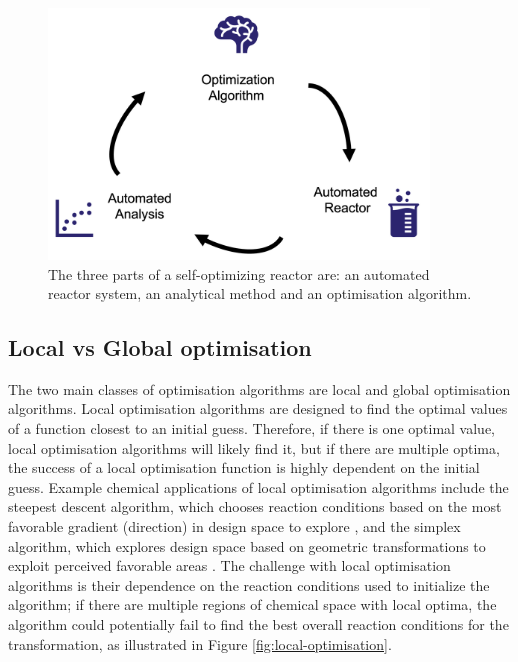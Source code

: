 \begin{figure}
    \centering
    \includegraphics[width=0.9\textwidth]{gfx/Chapter03/self-optimization-cycle.png}
    \caption{The three parts of a self-optimizing reactor are: an automated reactor system, an analytical method and an optimisation algorithm.}
    \label{fig:optimisation-cycle}
\end{figure}

\subsection{Local vs Global optimisation}
The two main classes of optimisation algorithms are local and global optimisation algorithms. Local optimisation algorithms are designed to find the optimal values of a function closest to an initial guess. Therefore, if there is one optimal value, local optimisation algorithms will likely find it, but if there are multiple optima, the success of a local optimisation function is highly dependent on the initial guess. Example chemical applications of local optimisation algorithms include the steepest descent algorithm, which chooses reaction conditions based on the most favorable gradient (direction) in design space to explore \cite{McMullen2010a}, and the simplex algorithm, which explores design space based on geometric transformations to exploit perceived favorable areas \cite{Routh1977, Bourne2011}. The challenge with local optimisation algorithms is their dependence on the reaction conditions used to initialize the algorithm; if there are multiple regions of chemical space with local optima, the algorithm could potentially fail to find the best overall reaction conditions for the transformation, as illustrated in Figure \ref{fig:local-optimisation}.

